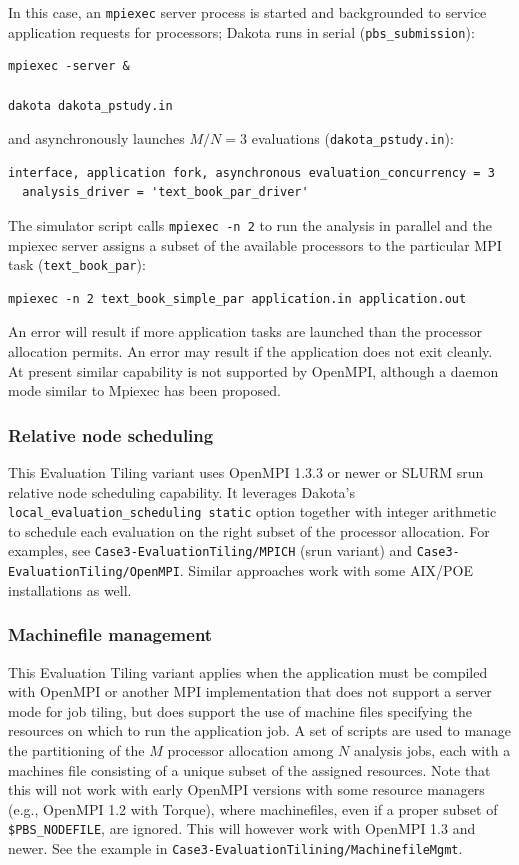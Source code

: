 In this case, an {\tt mpiexec} server process is started and
backgrounded to service application requests for processors; Dakota
runs in serial ({\tt pbs\_submission}):
\begin{verbatim}
mpiexec -server &

dakota dakota_pstudy.in
\end{verbatim}
and asynchronously launches $M/N=3$ evaluations ({\tt dakota\_pstudy.in}):
\begin{verbatim}
interface, application fork, asynchronous evaluation_concurrency = 3
  analysis_driver = 'text_book_par_driver'
\end{verbatim}
The simulator script calls {\tt mpiexec -n 2} to run the analysis in
parallel and the mpiexec server assigns a subset of the available
processors to the particular MPI task ({\tt text\_book\_par}):
\begin{verbatim}
mpiexec -n 2 text_book_simple_par application.in application.out
\end{verbatim}
An error will result if more application tasks are launched than the
processor allocation permits.  An error may result if the application
does not exit cleanly.  At present similar capability is not supported
by OpenMPI, although a daemon mode similar to Mpiexec has been
proposed.

\subsubsection{Relative node scheduling}

This Evaluation Tiling variant uses OpenMPI 1.3.3 or newer or SLURM srun 
relative node scheduling capability.  It leverages Dakota's
\texttt{local\_evaluation\_scheduling static} option together with
integer arithmetic to schedule each evaluation on the right subset of
the processor allocation.  For examples, see 
\texttt{Case3-EvaluationTiling/MPICH}
(srun variant) and \texttt{Case3-EvaluationTiling/OpenMPI}.  Similar approaches 
work with some AIX/POE installations as well.

\subsubsection{Machinefile management}

This Evaluation Tiling variant applies when the application must be compiled with
OpenMPI or another MPI implementation that does not support a server
mode for job tiling, but does support the use of machine files
specifying the resources on which to run the application job.  A set
of scripts are used to manage the partitioning of the $M$ processor
allocation among $N$ analysis jobs, each with a machines file
consisting of a unique subset of the assigned resources.  Note that
this will not work with early OpenMPI versions with some resource
managers (e.g., OpenMPI 1.2 with Torque), where machinefiles, even if
a proper subset of {\tt \$PBS\_NODEFILE}, are ignored.  This will
however work with OpenMPI 1.3 and newer.  See the example in
\texttt{Case3-EvaluationTilining/MachinefileMgmt}.

